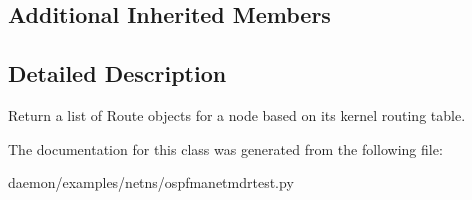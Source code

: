 \subsection*{Additional Inherited Members}


\subsection{Detailed Description}
\begin{DoxyVerb}Return a list of Route objects for a node based on its kernel 
    routing table.
\end{DoxyVerb}
 

The documentation for this class was generated from the following file\+:\begin{DoxyCompactItemize}
\item 
daemon/examples/netns/ospfmanetmdrtest.\+py\end{DoxyCompactItemize}
